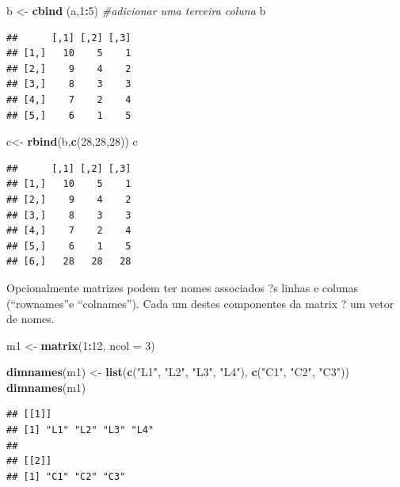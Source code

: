 \documentclass[]{book}
\newenvironment{Shaded}{\begin{snugshade}}{\end{snugshade}}
\newcommand{\CommentTok}[1]{\textcolor[rgb]{0.56,0.35,0.01}{\textit{#1}}}
\newcommand{\DataTypeTok}[1]{\textcolor[rgb]{0.13,0.29,0.53}{#1}}
\newcommand{\DecValTok}[1]{\textcolor[rgb]{0.00,0.00,0.81}{#1}}
\newcommand{\KeywordTok}[1]{\textcolor[rgb]{0.13,0.29,0.53}{\textbf{#1}}}
\newcommand{\NormalTok}[1]{#1}
\newcommand{\OperatorTok}[1]{\textcolor[rgb]{0.81,0.36,0.00}{\textbf{#1}}}
\newcommand{\StringTok}[1]{\textcolor[rgb]{0.31,0.60,0.02}{#1}}
\begin{document}
\begin{Shaded}
\begin{Highlighting}[]
\NormalTok{b <-}\StringTok{ }\KeywordTok{cbind}\NormalTok{ (a,}\DecValTok{1}\OperatorTok{:}\DecValTok{5}\NormalTok{) }\CommentTok{#adicionar uma terceira coluna}
\NormalTok{b}
\end{Highlighting}
\end{Shaded}

\begin{verbatim}
##      [,1] [,2] [,3]
## [1,]   10    5    1
## [2,]    9    4    2
## [3,]    8    3    3
## [4,]    7    2    4
## [5,]    6    1    5
\end{verbatim}

\begin{Shaded}
\begin{Highlighting}[]
\NormalTok{c<-}\StringTok{ }\KeywordTok{rbind}\NormalTok{(b,}\KeywordTok{c}\NormalTok{(}\DecValTok{28}\NormalTok{,}\DecValTok{28}\NormalTok{,}\DecValTok{28}\NormalTok{))}
\NormalTok{c}
\end{Highlighting}
\end{Shaded}

\begin{verbatim}
##      [,1] [,2] [,3]
## [1,]   10    5    1
## [2,]    9    4    2
## [3,]    8    3    3
## [4,]    7    2    4
## [5,]    6    1    5
## [6,]   28   28   28
\end{verbatim}

Opcionalmente matrizes podem ter nomes associados ?s linhas e colunas (``rownames''e ``colnames''). Cada um destes componentes da matrix ? um vetor de nomes.

\begin{Shaded}
\begin{Highlighting}[]
\NormalTok{m1 <-}\StringTok{ }\KeywordTok{matrix}\NormalTok{(}\DecValTok{1}\OperatorTok{:}\DecValTok{12}\NormalTok{, }\DataTypeTok{ncol =} \DecValTok{3}\NormalTok{) }

\KeywordTok{dimnames}\NormalTok{(m1) <-}\StringTok{ }\KeywordTok{list}\NormalTok{(}\KeywordTok{c}\NormalTok{(}\StringTok{"L1"}\NormalTok{, }\StringTok{"L2"}\NormalTok{, }\StringTok{"L3"}\NormalTok{, }\StringTok{"L4"}\NormalTok{), }\KeywordTok{c}\NormalTok{(}\StringTok{"C1"}\NormalTok{, }\StringTok{"C2"}\NormalTok{, }\StringTok{"C3"}\NormalTok{)) }
\KeywordTok{dimnames}\NormalTok{(m1)}
\end{Highlighting}
\end{Shaded}

\begin{verbatim}
## [[1]]
## [1] "L1" "L2" "L3" "L4"
## 
## [[2]]
## [1] "C1" "C2" "C3"
\end{verbatim}
\end{document}
